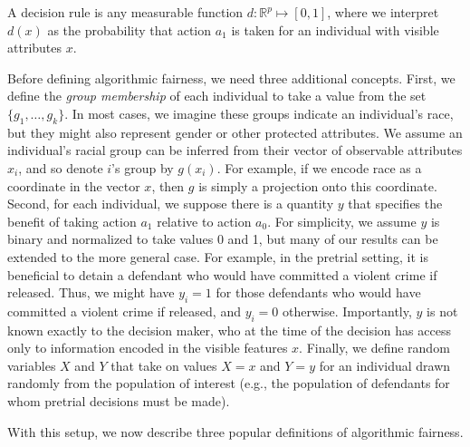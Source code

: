 \documentclass[sigconf]{acmart}
\newcommand{\RR}{\mathbb{R}}
\begin{document}
\begin{definition}
A decision rule is any measurable function $d: \RR^p \mapsto [0,1]$,
where we interpret $d(x)$ as the probability that action 
$a_1$ is taken for an individual with visible attributes $x$.
\end{definition}

Before defining algorithmic fairness, we need three additional concepts.
First, we define the \emph{group membership} of each individual to take a value from the set $\{g_1, \dots, g_k\}$. In most cases, we imagine these groups indicate an individual's race, but they might also represent gender or other protected attributes.
We assume an individual's racial  group can be inferred from their vector of observable attributes $x_i$, and so denote $i$'s group by $g(x_i)$.
For example, if we encode race as a coordinate in the vector $x$, 
then $g$ is simply a projection onto this coordinate.
Second, for each individual, we suppose there is a quantity
$y$ that specifies the benefit of taking action $a_1$ relative to action $a_0$.
For simplicity, we assume $y$ is binary and normalized to take values 0 and 1, but many of our
results can be extended to the more general case.
For example, in the pretrial setting, it is beneficial to
detain a defendant who would have committed a violent crime if released.
Thus, we might have $y_i = 1$ for those defendants who would have committed a violent crime if released, 
and $y_i=0$ otherwise.
Importantly, $y$ is not known exactly to the decision maker, who at the time of the decision 
has access only to information encoded in the visible features $x$.
Finally, we define random variables 
$X$ and $Y$ that take on values $X = x$ and $Y = y$ for an individual drawn randomly from the population of interest (e.g., the population of defendants for whom pretrial decisions must be made).

With this setup, we now describe three popular definitions of algorithmic fairness.
\end{document}
